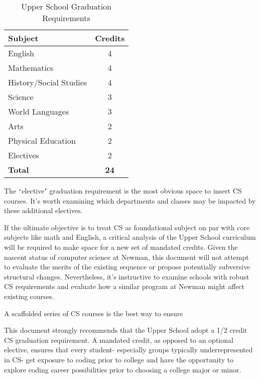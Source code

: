 \begin{table}
	\begin{center}
\begin{tabular}{ | l | c | }
	
	\hline
	\textbf{Subject} & \textbf{Credits} \\ \hline
	English & 4 \\ \hline
	Mathematics & 4 \\ \hline
	History/Social Studies & 4 \\ \hline
	Science & 3 \\ \hline
	World Languages & 3 \\ \hline
	Arts & 2 \\ \hline
	Physical Education & 2 \\ \hline
	Electives & 2 \\ \hline
	\textbf{Total} & \textbf{24} \\ \hline
\end{tabular} 
\caption{Upper School Graduation Requirements} \label{tab:usreqs} 
\end{center}
\end{table}
\par
The ``elective" graduation requirement is the most obvious space to insert CS courses. It's worth examining which departments and classes may be impacted by these additional electives.\par
If the ultimate objective is to treat CS as foundational subject on par with core subjects like math and English, a critical analysis of the Upper School curriculum will be required to make space for a new set of mandated credits. Given the nascent status of computer science at Newman, this document will not attempt to evaluate the merits of the existing sequence or propose potentially subversive structural changes. Nevertheless, it's instructive to examine schools with robust CS requirements and evaluate how a similar program at Newman might affect existing courses.\par






A scaffolded series of CS courses is the best way to ensure 

 \par
This document strongly recommends that the Upper School adopt a 1/2 credit CS graduation requirement. A mandated credit, as opposed to an optional elective, ensures that every student- especially groups typically underrepresented in CS- get exposure to coding prior to college and have the opportunity to explore coding career possibilities prior to choosing a college major or minor. \par

